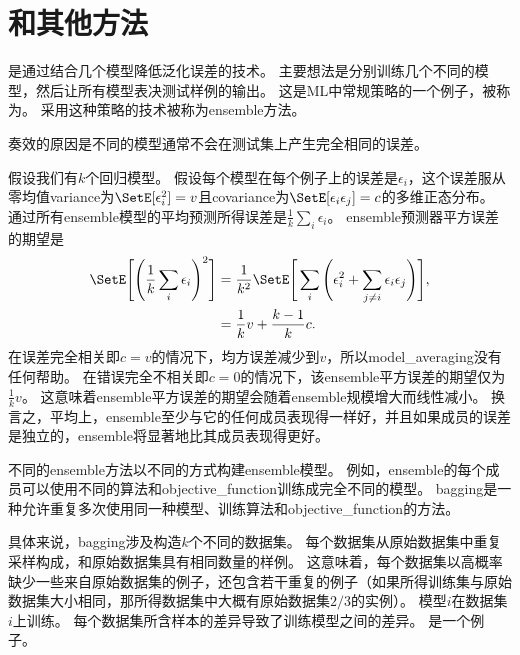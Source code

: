 \section{和其他方法}
\label{sec:bagging_and_other_ensemble_methods}
是通过结合几个模型降低泛化误差的技术\citep{ML:Breiman:bagging}。
主要想法是分别训练几个不同的模型，然后让所有模型表决测试样例的输出。
这是\gls{ML}中常规策略的一个例子，被称为。
采用这种策略的技术被称为\gls{ensemble}方法。

奏效的原因是不同的模型通常不会在测试集上产生完全相同的误差。

假设我们有$k$个回归模型。
假设每个模型在每个例子上的误差是$\epsilon_i$，这个误差服从零均值\gls{variance}为$\SetE[\epsilon_i^2] = v$且\gls{covariance}为$\SetE[\epsilon_i \epsilon_j] = c$的多维正态分布。
通过所有\gls{ensemble}模型的平均预测所得误差是$\frac{1}{k} \sum_i \epsilon_i$。 
\gls{ensemble}预测器平方误差的期望是
\begin{align}
 \SetE \Bigg[\Bigg(\frac{1}{k} \sum_i \epsilon_i \Bigg)^2\Bigg] &= \frac{1}{k^2} 
 \SetE \Bigg[\sum_i \Bigg(\epsilon_i^2 + \sum_{j \neq i} \epsilon_i \epsilon_j\Bigg)\Bigg], \\
&= \frac{1}{k} v + \frac{k-1}{k} c .                             
\end{align}
在误差完全相关即$c=v$的情况下，均方误差减少到$v$，所以\gls{model_averaging}没有任何帮助。
在错误完全不相关即$c =0$的情况下，该\gls{ensemble}平方误差的期望仅为$\frac{1}{k}v$。
这意味着\gls{ensemble}平方误差的期望会随着\gls{ensemble}规模增大而线性减小。
换言之，平均上，\gls{ensemble}至少与它的任何成员表现得一样好，并且如果成员的误差是独立的，\gls{ensemble}将显著地比其成员表现得更好。

不同的\gls{ensemble}方法以不同的方式构建\gls{ensemble}模型。
例如，\gls{ensemble}的每个成员可以使用不同的算法和\gls{objective_function}训练成完全不同的模型。
\gls{bagging}是一种允许重复多次使用同一种模型、训练算法和\gls{objective_function}的方法。


具体来说，\gls{bagging}涉及构造$k$个不同的数据集。
每个数据集从原始数据集中重复采样构成，和原始数据集具有相同数量的样例。
这意味着，每个数据集以高概率缺少一些来自原始数据集的例子，还包含若干重复的例子（如果所得训练集与原始数据集大小相同，那所得数据集中大概有原始数据集$2/3$的实例）。
模型$i$在数据集$i$上训练。
每个数据集所含样本的差异导致了训练模型之间的差异。
是一个例子。

